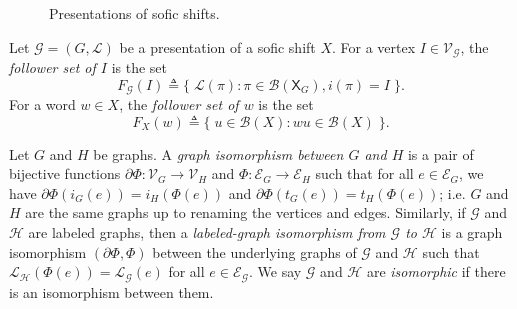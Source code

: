 \documentclass[hidelinks]{report}
\newcommand{\Lc}{\mathcal{L}}  %
\newcommand{\Gc}{\mathcal{G}}  %
\newcommand{\Hc}{\mathcal{H}}  %
\newcommand{\Vc}{\mathcal{V}}
\newcommand{\Ec}{\mathcal{E}}
\newcommand{\Bc}{\mathcal{B}}
\newcommand{\shift}[1]{\mathsf{X}_{#1}}
\newcommand{\term}[1]{\textit{#1}}
\theoremstyle{definition}
\begin{document}
\begin{figure}
\begin{subfigure}{0.31\textwidth}
        \caption{}\label{nonminimaleven}
    \end{subfigure}
    \begin{subfigure}{0.31\textwidth}
        \caption{}\label{nondeterministiceven}
    \end{subfigure}
    \caption{Presentations of sofic shifts.}
\end{figure}

\begin{definition}
    Let \(\Gc = (G, \Lc)\) be a presentation of a sofic shift \(X\). For a vertex \(I \in \Vc_\Gc\), the 
    \term{follower set of \(I\)} is the set 
    \[F_\Gc(I) \triangleq \big\{ \; \Lc(\pi) : \pi \in \Bc(\shift{G}), i(\pi) = I \; \big\}.\]
    For a word \(w \in X\), the \term{follower set of \(w\)}
    is the set 
    \[F_X(w) \triangleq \big\{ \; u \in \Bc(X) : wu \in \Bc(X) \; \big\}.\]
\end{definition}

Let \(G\) and \(H\) be graphs. A \term{graph isomorphism between \(G\) and \(H\)}
is a pair of bijective functions \(\partial\Phi : \Vc_G \to \Vc_H\) and \(\Phi : \Ec_G \to \Ec_H\)
such that for all \(e \in \Ec_G\), we have \(\partial\Phi(i_G(e)) = i_H(\Phi(e))\)
and \(\partial\Phi(t_G(e)) = t_H(\Phi(e))\); i.e. \(G\) and \(H\) are the 
same graphs up to renaming the vertices and edges. Similarly, if \(\Gc\)
and \(\Hc\) are labeled graphs, then a \term{labeled-graph isomorphism from \(\Gc\) to \(\Hc\)}
is a graph isomorphism \((\partial\Phi, \Phi)\) between the underlying graphs of \(\Gc\)
and \(\Hc\) such that 
\(\Lc_\Hc(\Phi(e)) = \Lc_\Gc(e)\) for all \(e \in \Ec_\Gc\). We say 
\(\Gc\) and \(\Hc\) are \term{isomorphic} if there is an isomorphism between them.
\end{document}
